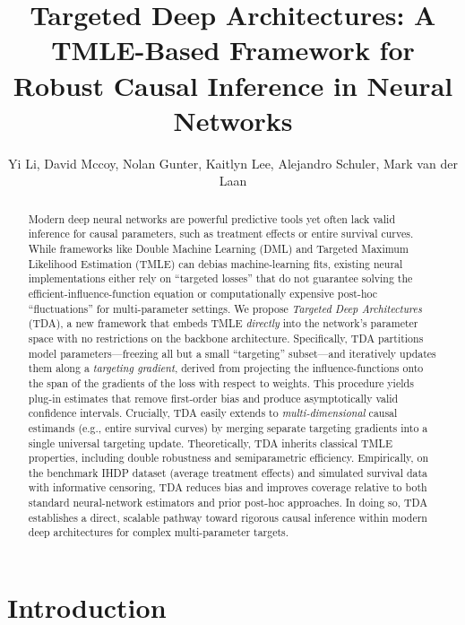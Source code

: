 \documentclass{article}
\title{Targeted Deep Architectures: A TMLE-Based Framework for Robust Causal Inference in Neural Networks}
\author{Yi Li, David Mccoy, Nolan Gunter, Kaitlyn Lee, Alejandro Schuler, Mark van der Laan}
\theoremstyle{remark}
\begin{document}
\maketitle


\begin{abstract}
Modern deep neural networks are powerful predictive tools yet often lack valid inference for causal parameters, such as treatment effects or entire survival curves. While frameworks like Double Machine Learning (DML) and Targeted Maximum Likelihood Estimation (TMLE) can debias machine-learning fits, existing neural implementations either rely on “targeted losses” that do not guarantee solving the efficient-influence-function equation or computationally expensive post-hoc “fluctuations” for multi-parameter settings. We propose \emph{Targeted Deep Architectures} (TDA), a new framework that embeds TMLE \emph{directly} into the network’s parameter space with no restrictions on the backbone architecture. Specifically, TDA partitions model parameters—freezing all but a small “targeting” subset—and iteratively updates them along a \emph{targeting gradient}, derived from projecting the influence-functions onto the span of the gradients of the loss with respect to weights. This procedure yields plug-in estimates that remove first-order bias and produce asymptotically valid confidence intervals. Crucially, TDA easily extends to \emph{multi-dimensional} causal estimands (e.g., entire survival curves) by merging separate targeting gradients into a single universal targeting update. Theoretically, TDA inherits classical TMLE properties, including double robustness and semiparametric efficiency. Empirically, on the benchmark IHDP dataset (average treatment effects) and simulated survival data with informative censoring, TDA reduces bias and improves coverage relative to both standard neural-network estimators and prior post-hoc approaches. In doing so, TDA establishes a direct, scalable pathway toward rigorous causal inference within modern deep architectures for complex multi-parameter targets.

\end{abstract}


\section{Introduction}
\label{sec:intro}
\end{document}
